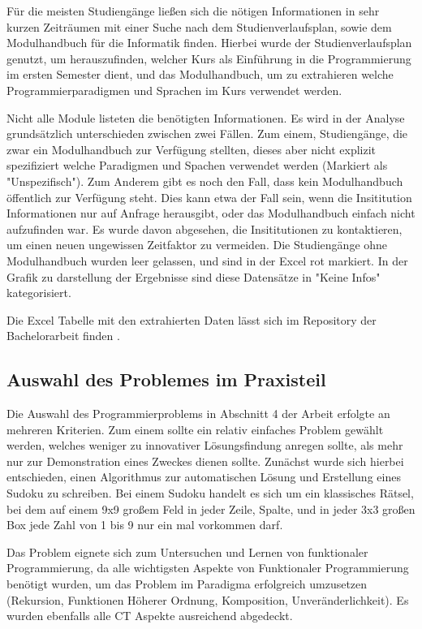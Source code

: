 Für die meisten Studiengänge ließen sich die nötigen Informationen in sehr kurzen Zeiträumen mit einer Suche nach dem Studienverlaufsplan, sowie dem Modulhandbuch für die Informatik finden.
Hierbei wurde der Studienverlaufsplan genutzt, um herauszufinden, welcher Kurs als Einführung in die Programmierung im ersten Semester dient, und das Modulhandbuch, um zu extrahieren welche Programmierparadigmen und Sprachen im Kurs verwendet werden.

Nicht alle Module listeten die benötigten Informationen. Es wird in der Analyse grundsätzlich unterschieden zwischen zwei Fällen. Zum einem, Studiengänge, die zwar ein Modulhandbuch zur Verfügung stellten, dieses aber nicht explizit spezifiziert welche Paradigmen und Spachen verwendet werden (Markiert als "Unspezifisch"). Zum Anderem gibt es noch den Fall, dass kein Modulhandbuch öffentlich zur Verfügung steht. Dies kann etwa der Fall sein, wenn die Insititution Informationen nur auf Anfrage herausgibt, oder das Modulhandbuch einfach nicht aufzufinden war. Es wurde davon abgesehen, die Insititutionen zu kontaktieren, um einen neuen ungewissen Zeitfaktor zu vermeiden. Die Studiengänge ohne Modulhandbuch wurden leer gelassen, und sind in der Excel rot markiert. In der Grafik zu darstellung der Ergebnisse sind diese Datensätze in "Keine Infos" kategorisiert.

Die Excel Tabelle mit den extrahierten Daten lässt sich im Repository der Bachelorarbeit finden \cite{repoxlsx}.

\subsection{Auswahl des Problemes im Praxisteil}
Die Auswahl des Programmierproblems in Abschnitt 4 der Arbeit erfolgte an mehreren Kriterien. Zum einem sollte ein relativ einfaches Problem gewählt werden, welches weniger zu innovativer Lösungsfindung anregen sollte, als mehr nur zur Demonstration eines Zweckes dienen sollte.
Zunächst wurde sich hierbei entschieden, einen Algorithmus zur automatischen Lösung und Erstellung eines Sudoku zu schreiben.
Bei einem Sudoku handelt es sich um ein klassisches Rätsel, bei dem auf einem 9x9 großem Feld in jeder Zeile, Spalte, und in jeder 3x3 großen Box jede Zahl von 1 bis 9 nur ein mal vorkommen darf.

Das Problem eignete sich zum Untersuchen und Lernen von funktionaler Programmierung, da alle wichtigsten Aspekte von Funktionaler Programmierung benötigt wurden, um das Problem im Paradigma erfolgreich umzusetzen (Rekursion, Funktionen Höherer Ordnung, Komposition, Unveränderlichkeit). Es wurden ebenfalls alle CT Aspekte ausreichend abgedeckt.

